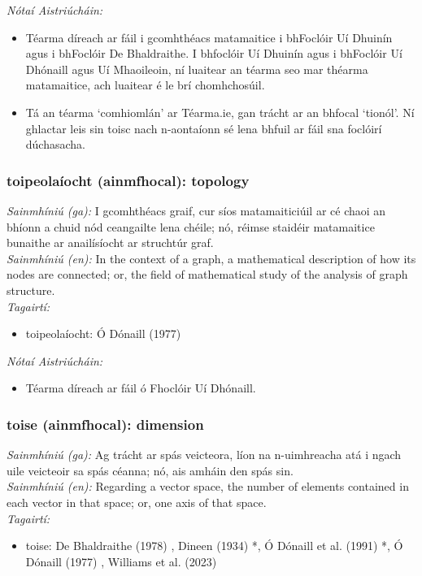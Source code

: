  \noindent \textit{Nótaí Aistriúcháin:}
\begin{itemize}
	\item Téarma díreach ar fáil i gcomhthéacs matamaitice i bhFoclóir Uí Dhuinín agus i bhFoclóir De Bhaldraithe. I bhfoclóir Uí Dhuinín agus i bhFoclóir Uí Dhónaill agus Uí Mhaoileoin, ní luaitear an téarma seo mar théarma matamaitice, ach luaitear é le brí chomhchosúil.
	\item Tá an téarma `comhiomlán' ar Téarma.ie, gan trácht ar an bhfocal `tionól'. Ní ghlactar leis sin toisc nach n-aontaíonn sé lena bhfuil ar fáil sna foclóirí dúchasacha. 
\end{itemize}


\subsubsection*{toipeolaíocht (ainmfhocal): topology}
 \noindent \textit{Sainmhíniú (ga):} I gcomhthéacs graif, cur síos matamaiticiúil ar cé chaoi an bhíonn a chuid nód ceangailte lena chéile; nó, réimse staidéir matamaitice bunaithe ar anailísíocht ar struchtúr graf.
\\
 \noindent \textit{Sainmhíniú (en):} In the context of a graph, a mathematical description of how its nodes are connected; or, the field of mathematical study of the analysis of graph structure.
\\
 \noindent \textit{Tagairtí:}
\begin{itemize}
	\item toipeolaíocht: Ó Dónaill (1977) \cite{odonaill}
\end{itemize}

 \noindent \textit{Nótaí Aistriúcháin:}
\begin{itemize}
	\item Téarma díreach ar fáil ó Fhoclóir Uí Dhónaill.
\end{itemize}


\subsubsection*{toise (ainmfhocal): dimension}
 \noindent \textit{Sainmhíniú (ga):} Ag trácht ar spás veicteora, líon na n-uimhreacha atá i ngach uile veicteoir sa spás céanna; nó, ais amháin den spás sin.
\\
 \noindent \textit{Sainmhíniú (en):} Regarding a vector space, the number of elements contained in each vector in that space; or, one axis of that space.
\\
 \noindent \textit{Tagairtí:}
\begin{itemize}
	\item toise: De Bhaldraithe (1978) \cite{de-bhaldraithe}, Dineen (1934) \cite{dineen}*, Ó Dónaill et al. (1991) \cite{focloir-beag}*, Ó Dónaill (1977) \cite{odonaill}, Williams et al. (2023) \cite{storchiste}
\end{itemize}

